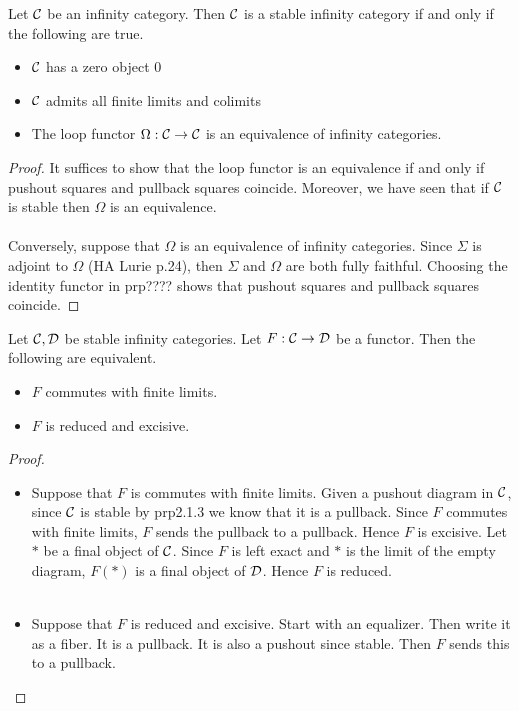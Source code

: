 \documentclass[a4paper]{article}
\begin{document}
\begin{prp}{}{} Let $\mathcal{C}$ be an infinity category. Then $\mathcal{C}$ is a stable infinity category if and only if the following are true. 
\begin{itemize}
\item $\mathcal{C}$ has a zero object $0$
\item $\mathcal{C}$ admits all finite limits and colimits
\item The loop functor $\Omega:\mathcal{C}\to\mathcal{C}$ is an equivalence of infinity categories. 
\end{itemize} \tcbline
\begin{proof}
It suffices to show that the loop functor is an equivalence if and only if pushout squares and pullback squares coincide. Moreover, we have seen that if $\mathcal{C}$ is stable then $\Omega$ is an equivalence. \\~\\

Conversely, suppose that $\Omega$ is an equivalence of infinity categories. Since $\Sigma$ is adjoint to $\Omega$ (HA Lurie p.24), then $\Sigma$ and $\Omega$ are both fully faithful. Choosing the identity functor in prp???? shows that pushout squares and pullback squares coincide. 
\end{proof}
\end{prp}

\begin{prp}{}{} Let $\mathcal{C},\mathcal{D}$ be stable infinity categories. Let $F:\mathcal{C}\to\mathcal{D}$ be a functor. Then the following are equivalent. 
\begin{itemize}
\item $F$ commutes with finite limits. 
\item $F$ is reduced and excisive. 
\end{itemize} \tcbline
\begin{proof}~\\
\begin{itemize}
\item Suppose that $F$ is commutes with finite limits. Given a pushout diagram in $\mathcal{C}$, since $\mathcal{C}$ is stable by prp2.1.3 we know that it is a pullback. Since $F$ commutes with finite limits, $F$ sends the pullback to a pullback. Hence $F$ is excisive. Let $\ast$ be a final object of $\mathcal{C}$. Since $F$ is left exact and $\ast$ is the limit of the empty diagram, $F(\ast)$ is a final object of $\mathcal{D}$. Hence $F$ is reduced. \\~\\
\item Suppose that $F$ is reduced and excisive. Start with an equalizer. Then write it as a fiber. It is a pullback. It is also a pushout since stable. Then $F$ sends this to a pullback. 
\end{itemize}
\end{proof}
\end{prp}
\end{document}
